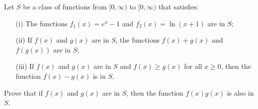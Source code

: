 Let $S$ be a class of functions from $[0, \infty)$ to $[0, \infty)$ that satisfies:
\begin{itemize}
\item[(i)]
The functions $f_1(x) = e^x - 1$ and $f_2(x) = \ln(x+1)$ are in $S$;
\item[(ii)]
If $f(x)$ and $g(x)$ are in $S$, the functions $f(x) + g(x)$ and $f(g(x))$ are in $S$;
\item[(iii)]
If $f(x)$ and $g(x)$ are in $S$ and $f(x) \geq g(x)$ for all $x \geq 0$, then the function
$f(x) - g(x)$ is in $S$.
\end{itemize}
Prove that if $f(x)$ and $g(x)$ are in $S$, then the function $f(x) g(x)$ is also in $S$.
